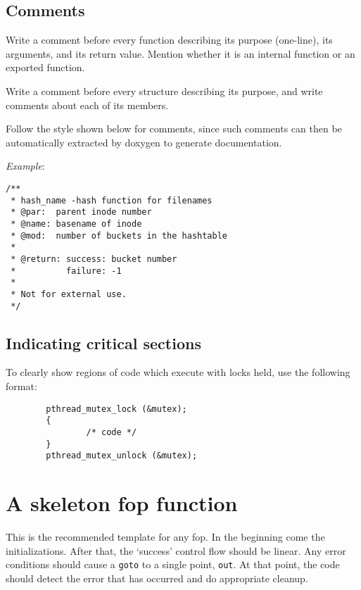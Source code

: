 \documentclass{article}[12pt]
\begin{document}
\subsection*{Comments}
Write a comment before every function describing its purpose (one-line),
its arguments, and its return value. Mention whether it is an internal
function or an exported function.

Write a comment before every structure describing its purpose, and
write comments about each of its members.

Follow the style shown below for comments, since such comments
can then be automatically extracted by doxygen to generate
documentation.

\textsl{Example}:
\begin{verbatim}
/**
 * hash_name -hash function for filenames
 * @par:  parent inode number
 * @name: basename of inode
 * @mod:  number of buckets in the hashtable
 *
 * @return: success: bucket number
 *          failure: -1
 *
 * Not for external use.
 */
\end{verbatim}

\subsection*{Indicating critical sections}
To clearly show regions of code which execute with locks held, use
the following format:

\begin{verbatim}
        pthread_mutex_lock (&mutex);
        {
                /* code */
        }
        pthread_mutex_unlock (&mutex);
\end{verbatim}

\section*{A skeleton fop function}
This is the recommended template for any fop. In the beginning come
the initializations. After that, the `success' control flow should be
linear.  Any error conditions should cause a \texttt{goto} to a single
point, \texttt{out}.  At that point, the code should detect the error
that has occurred and do appropriate cleanup.
\end{document}
